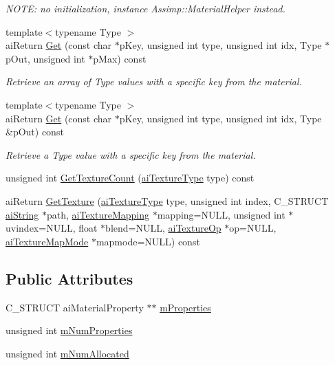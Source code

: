 \begin{DoxyCompactItemize}
\begin{DoxyCompactList}\small\item\em N\-O\-T\-E\-: no initialization, instance Assimp\-::\-Material\-Helper instead. \end{DoxyCompactList}\item 
{\footnotesize template$<$typename Type $>$ }\\ai\-Return \hyperlink{structai_material_ace8dbb50ac9e239eca08292c7c961057}{Get} (const char $\ast$p\-Key, unsigned int type, unsigned int idx, Type $\ast$p\-Out, unsigned int $\ast$p\-Max) const 
\begin{DoxyCompactList}\small\item\em Retrieve an array of Type values with a specific key from the material. \end{DoxyCompactList}\item 
{\footnotesize template$<$typename Type $>$ }\\ai\-Return \hyperlink{structai_material_a6813bb11ee8d1de9d1d99a60cdb304d3}{Get} (const char $\ast$p\-Key, unsigned int type, unsigned int idx, Type \&p\-Out) const 
\begin{DoxyCompactList}\small\item\em Retrieve a Type value with a specific key from the material. \end{DoxyCompactList}\item 
unsigned int \hyperlink{structai_material_ad619f2bc4400c19caede1ef68b483ff4}{Get\-Texture\-Count} (\hyperlink{ai_material_8h_a7dd415ff703a2cc53d1c22ddbbd7dde0}{ai\-Texture\-Type} type) const 
\item 
ai\-Return \hyperlink{structai_material_aa2007a8ac452dd7d3fb1fb49298d5ffe}{Get\-Texture} (\hyperlink{ai_material_8h_a7dd415ff703a2cc53d1c22ddbbd7dde0}{ai\-Texture\-Type} type, unsigned int index, C\-\_\-\-S\-T\-R\-U\-C\-T \hyperlink{structai_string}{ai\-String} $\ast$path, \hyperlink{ai_material_8h_a6186e909f1ae28133ab10f1b4635b0f9}{ai\-Texture\-Mapping} $\ast$mapping=N\-U\-L\-L, unsigned int $\ast$uvindex=N\-U\-L\-L, float $\ast$blend=N\-U\-L\-L, \hyperlink{ai_material_8h_afcd3096d69affba13114cedfc6f9ee6b}{ai\-Texture\-Op} $\ast$op=N\-U\-L\-L, \hyperlink{ai_material_8h_a6cbe56056751aa80e8dd714632a49de0}{ai\-Texture\-Map\-Mode} $\ast$mapmode=N\-U\-L\-L) const 
\end{DoxyCompactItemize}
\subsection*{Public Attributes}
\begin{DoxyCompactItemize}
\item 
C\-\_\-\-S\-T\-R\-U\-C\-T ai\-Material\-Property $\ast$$\ast$ \hyperlink{structai_material_af32b125d54bff5bc1fc54a1007487cab}{m\-Properties}
\item 
unsigned int \hyperlink{structai_material_a243b07afdc6507f8878c93a2cafe4963}{m\-Num\-Properties}
\item 
unsigned int \hyperlink{structai_material_a84a0016a263362c52b27a9d8d76dc449}{m\-Num\-Allocated}
\end{DoxyCompactItemize}


